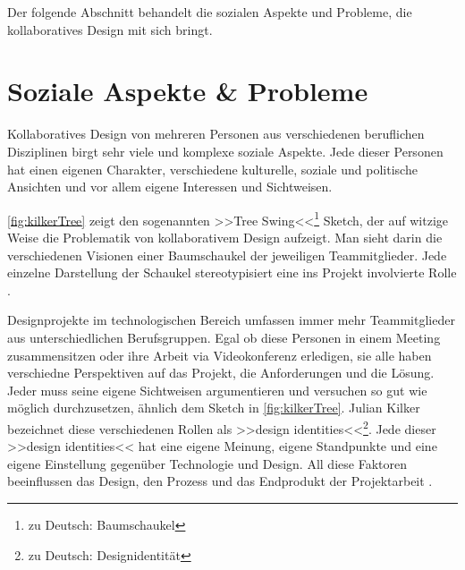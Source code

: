 Der folgende Abschnitt behandelt die sozialen Aspekte und Probleme, die kollaboratives Design mit sich bringt.

\section{Soziale Aspekte \& Probleme} 

Kollaboratives Design von mehreren Personen aus verschiedenen beruflichen Disziplinen birgt sehr viele und komplexe soziale Aspekte. Jede dieser Personen hat einen eigenen Charakter, verschiedene kulturelle, soziale und politische Ansichten und vor allem eigene Interessen und Sichtweisen.

\autoref{fig:kilkerTree} zeigt den sogenannten >>Tree Swing<<\footnote{zu Deutsch: Baumschaukel} Sketch, der auf witzige Weise die Problematik von kollaborativem Design aufzeigt. Man sieht darin die verschiedenen Visionen einer Baumschaukel der jeweiligen Teammitglieder. Jede einzelne Darstellung der Schaukel stereotypisiert eine ins Projekt involvierte Rolle \citep{Kilker:1999}.

\medskip Designprojekte im technologischen Bereich umfassen immer mehr Teammitglieder aus unterschiedlichen Berufsgruppen. Egal ob diese Personen in einem Meeting zusammensitzen oder ihre Arbeit via Videokonferenz erledigen, sie alle haben verschiedne Perspektiven auf das Projekt, die Anforderungen und die Lösung. Jeder muss seine eigene Sichtweisen argumentieren und versuchen so gut wie möglich durchzusetzen, ähnlich dem Sketch in \autoref{fig:kilkerTree}. Julian Kilker bezeichnet diese verschiedenen Rollen als >>design identities<<\footnote{zu Deutsch: Designidentität}. Jede dieser >>design identities<< hat eine eigene Meinung, eigene Standpunkte und eine eigene Einstellung gegenüber Technologie und Design. All diese Faktoren beeinflussen das Design, den Prozess und das Endprodukt der Projektarbeit \citep{Kilker:1999}.

